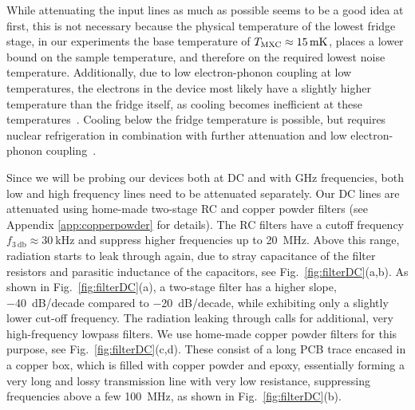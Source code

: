 While attenuating the input lines as much as possible seems to be a good idea at first, this is not necessary because the physical temperature of the lowest fridge stage, in our experiments the base temperature of $T_{\rm MXC}\approx\SI{15}{\milli\kelvin}$, places a lower bound on the sample temperature, and therefore on the required lowest noise temperature.
%
Additionally, due to low electron-phonon coupling at low temperatures, the electrons in the device most likely have a slightly higher temperature than the fridge itself, as cooling becomes inefficient at these temperatures~\cite{giazottoOpportunitiesMesoscopicsThermometry2006}.
%
Cooling below the fridge temperature is possible, but requires nuclear refrigeration in combination with further attenuation and low electron-phonon coupling~\cite{sarsby500MicrokelvinNanoelectronics2020,jonesProgressCoolingNanoelectronic2020}.
%

Since we will be probing our devices both at DC and with \si{\giga\hertz} frequencies, both low and high frequency lines need to be attenuated separately.
%
Our DC lines are attenuated using home-made two-stage RC and copper powder filters (see Appendix \ref{app:copperpowder} for details).
%
The RC filters have a cutoff frequency $f_{\SI{3}{\decibel}}\approx\SI{30}{\kilo\hertz}$ and suppress higher frequencies up to \SI{20}{\mega\hertz}.
%
Above this range, radiation starts to leak through again, due to stray capacitance of the filter resistors and parasitic inductance of the capacitors, see Fig.~\ref{fig:filterDC}(a,b).
%
As shown in Fig.~\ref{fig:filterDC}(a), a two-stage filter has a higher slope, \SI{-40}{dB/decade} compared to \SI{-20}{dB/decade}, while exhibiting only a slightly lower cut-off frequency.
%
The radiation leaking through calls for additional, very high-frequency lowpass filters.
%
We use home-made copper powder filters for this purpose, see Fig.~\ref{fig:filterDC}(c,d).
%
These consist of a long PCB trace encased in a copper box, which is filled with copper powder and epoxy, essentially forming a very long and lossy transmission line with very low resistance, suppressing frequencies above a few \SI{100}{\mega\hertz}, as shown in Fig.~\ref{fig:filterDC}(b).

